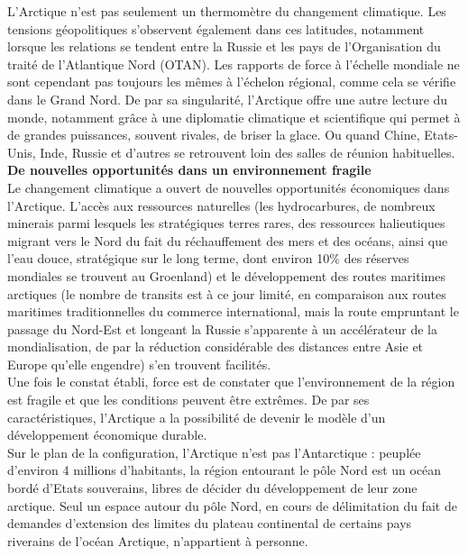 \documentclass[8pt]{article}
\begin{document}
L’Arctique n’est pas seulement un thermomètre du changement climatique. Les tensions géopolitiques s’observent également dans ces latitudes, notamment lorsque les relations se tendent entre la Russie et les pays de l’Organisation du traité de l’Atlantique Nord (OTAN). Les rapports de force à l’échelle mondiale ne sont cependant pas toujours les mêmes à l’échelon régional, comme cela se vérifie dans le Grand Nord. De par sa singularité, l’Arctique offre une autre lecture du monde, notamment grâce à une diplomatie climatique et scientifique qui permet à de grandes puissances, souvent rivales, de briser la glace. Ou quand Chine, Etats-Unis, Inde, Russie et d’autres se retrouvent loin des salles de réunion habituelles.\\

\textbf{De nouvelles opportunités dans un environnement fragile}\\

Le changement climatique a ouvert de nouvelles opportunités économiques dans l’Arctique. L’accès aux ressources naturelles (les hydrocarbures, de nombreux minerais parmi lesquels les stratégiques terres rares, des ressources halieutiques migrant vers le Nord du fait du réchauffement des mers et des océans, ainsi que l’eau douce, stratégique sur le long terme, dont environ 10\% des réserves mondiales se trouvent au Groenland) et le développement des routes maritimes arctiques (le nombre de transits est à ce jour limité, en comparaison aux routes maritimes traditionnelles du commerce international, mais la route empruntant le passage du Nord-Est et longeant la Russie s’apparente à un accélérateur de la mondialisation, de par la réduction considérable des distances entre Asie et Europe qu’elle engendre) s’en trouvent facilités.\\

Une fois le constat établi, force est de constater que l’environnement de la région est fragile et que les conditions peuvent être extrêmes. De par ses caractéristiques, l’Arctique a la possibilité de devenir le modèle d’un développement économique durable.\\

Sur le plan de la configuration, l’Arctique n’est pas l’Antarctique : peuplée d’environ 4 millions d’habitants, la région entourant le pôle Nord est un océan bordé d’Etats souverains, libres de décider du développement de leur zone arctique. Seul un espace autour du pôle Nord, en cours de délimitation du fait de demandes d’extension des limites du plateau continental de certains pays riverains de l’océan Arctique, n’appartient à personne.\\
\end{document}
